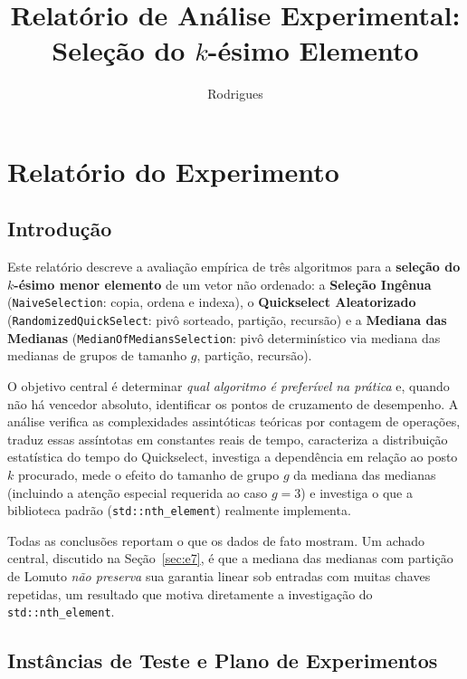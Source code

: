 \documentclass{infufrgs}
\title{Relatório de Análise Experimental: Seleção do $k$-ésimo Elemento}
\author{Rodrigues}{Juliana}
\begin{document}
\maketitle

\chapter{Relatório do Experimento}

\section{Introdução}

Este relatório descreve a avaliação empírica de três algoritmos para a \textbf{seleção do $k$-ésimo menor elemento} de um vetor não ordenado: a \textbf{Seleção Ingênua} (\texttt{NaiveSelection}: copia, ordena e indexa), o \textbf{Quickselect Aleatorizado} (\texttt{RandomizedQuickSelect}: pivô sorteado, partição, recursão) e a \textbf{Mediana das Medianas} (\texttt{MedianOfMediansSelection}: pivô determinístico via mediana das medianas de grupos de tamanho $g$, partição, recursão).

O objetivo central é determinar \emph{qual algoritmo é preferível na prática} e, quando não há vencedor absoluto, identificar os pontos de cruzamento de desempenho. A análise verifica as complexidades assintóticas teóricas por contagem de operações, traduz essas assíntotas em constantes reais de tempo, caracteriza a distribuição estatística do tempo do Quickselect, investiga a dependência em relação ao posto $k$ procurado, mede o efeito do tamanho de grupo $g$ da mediana das medianas (incluindo a atenção especial requerida ao caso $g = 3$) e investiga o que a biblioteca padrão (\texttt{std::nth\_element}) realmente implementa.

Todas as conclusões reportam o que os dados de fato mostram. Um achado central, discutido na Seção~\ref{sec:e7}, é que a mediana das medianas com partição de Lomuto \emph{não preserva} sua garantia linear sob entradas com muitas chaves repetidas, um resultado que motiva diretamente a investigação do \texttt{std::nth\_element}.

\section{Instâncias de Teste e Plano de Experimentos}
\end{document}
